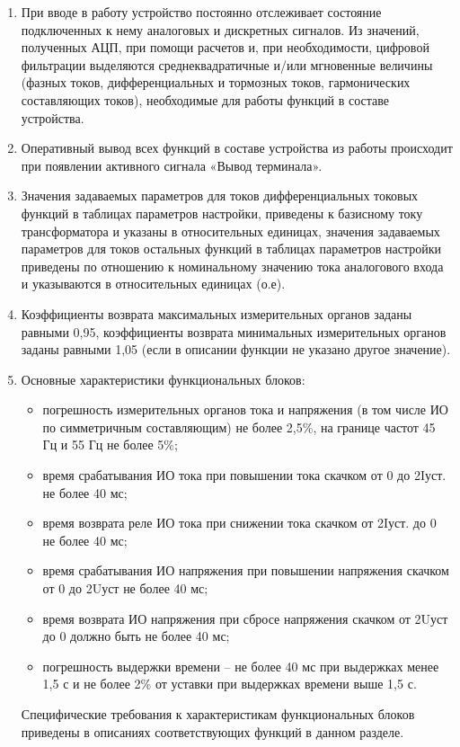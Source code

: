 \documentclass[a4paper, 12pt, table, hidelinks, DIV=calc]{extarticle}
\begin{document}
\begin{enumerate}[label=\arabic{section}.\arabic{subsection}.\arabic*, labelsep=4pt, leftmargin=0pt, itemindent=57pt]
    
\item
При вводе в работу устройство постоянно отслеживает состояние подключенных к нему аналоговых и дискретных сигналов. Из значений, полученных АЦП, при помощи расчетов и, при необходимости, цифровой фильтрации выделяются среднеквадратичные и/или мгновенные величины (фазных токов, дифференциальных и тормозных токов, гармонических составляющих токов), необходимые для работы функций в составе устройства.
\item
Оперативный вывод всех функций в составе устройства из работы происходит при появлении активного сигнала «Вывод терминала».
\item
Значения задаваемых параметров для токов дифференциальных токовых функций в таблицах параметров настройки, приведены к базисному току трансформатора и указаны в относительных единицах, значения задаваемых параметров для токов остальных функций в таблицах параметров настройки приведены по отношению к номинальному значению тока аналогового входа и указываются в относительных единицах (о.е).  
\item
Коэффициенты возврата максимальных измерительных органов заданы равными 0,95, коэффициенты возврата минимальных измерительных органов заданы равными 1,05 (если в описании функции не указано другое значение).

\item
Основные характеристики функциональных блоков:
\begin{itemize}
    \item погрешность измерительных органов тока и напряжения (в том числе ИО по симметричным составляющим) не более 2,5\%, на границе частот 45 Гц и 55 Гц не более 5\%;
    \item время срабатывания ИО тока при повышении тока скачком от 0 до 2Iуст. не более 40 мс;
    \item время возврата реле ИО тока при снижении тока скачком от 2Iуст. до 0 не более 40 мс;
    \item время срабатывания ИО напряжения при повышении напряжения скачком от 0 до 2Uуст не более 40 мс;
    \item время возврата ИО напряжения при сбросе напряжения скачком от 2Uуст до 0 должно быть не более 40 мс; 
    \item погрешность выдержки времени -- не более 40 мс при выдержках менее 1,5 с и не более 2\% от уставки при выдержках времени выше 1,5 с.
\end{itemize}
Специфические требования к характеристикам функциональных блоков приведены в описаниях соответствующих функций в данном разделе.


\end{enumerate}
\end{document}
